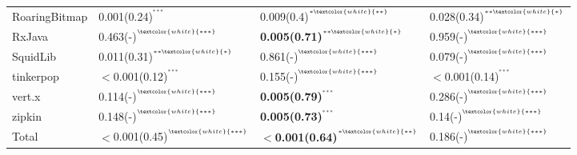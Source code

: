 \begin{tabular}{llll}
RoaringBitmap       &  0.001(0.24)\tiny{$^{^{***}}$} &  0.009(0.4)\tiny{$^{^{*\textcolor{white}{**}}}$} &  0.028(0.34)\tiny{$^{^{**\textcolor{white}{*}}}$} \\
RxJava              &  0.463(-)\tiny{$^{^{\textcolor{white}{***}}}$} &  \textbf{0.005(0.71)}\tiny{$^{^{**\textcolor{white}{*}}}$} &  0.959(-)\tiny{$^{^{\textcolor{white}{***}}}$} \\
SquidLib            &  0.011(0.31)\tiny{$^{^{**\textcolor{white}{*}}}$} &  0.861(-)\tiny{$^{^{\textcolor{white}{***}}}$} &  0.079(-)\tiny{$^{^{\textcolor{white}{***}}}$} \\
tinkerpop           &  $<$0.001(0.12)\tiny{$^{^{***}}$} &  0.155(-)\tiny{$^{^{\textcolor{white}{***}}}$} &  $<$0.001(0.14)\tiny{$^{^{***}}$} \\
vert.x              &  0.114(-)\tiny{$^{^{\textcolor{white}{***}}}$} &  \textbf{0.005(0.79)}\tiny{$^{^{***}}$} &  0.286(-)\tiny{$^{^{\textcolor{white}{***}}}$} \\
zipkin              &  0.148(-)\tiny{$^{^{\textcolor{white}{***}}}$} &  \textbf{0.005(0.73)}\tiny{$^{^{***}}$} &  0.14(-)\tiny{$^{^{\textcolor{white}{***}}}$} \\
Total               &  $<$0.001(0.45)\tiny{$^{^{\textcolor{white}{***}}}$} &  \textbf{$<$0.001(0.64)}\tiny{$^{^{*\textcolor{white}{**}}}$} &  0.186(-)\tiny{$^{^{\textcolor{white}{***}}}$} \\
\bottomrule
\end{tabular}
